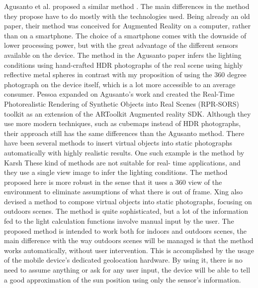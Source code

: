 
Agusanto et al. proposed a similar method \cite{agusanto2003}. The main differences in the method they propose have to do mostly with the technologies used. Being already an old paper, their method was conceived for Augmented Reality on a computer, rather than on a smartphone. The choice of a smartphone comes with the downside of lower processing power, but with the great advantage of the different sensors available on the device. The method in the Agusanto paper infers the lighting conditions using hand-crafted HDR photographs of the real scene using highly reflective metal spheres in contrast with my proposition of using the 360 degree photograph on the device itself, which is a lot more accessible to an average consumer.\newline
Pessoa\cite{pessoa2011} expanded on Agusanto's work and created the Real-Time Photorealistic Rendering of Synthetic Objects into Real Scenes (RPR-SORS) toolkit as an extension of the ARToolkit Augmented reality SDK. Although they use more modern techniques, such as cubemaps instead of HDR photographs, their approach still has the same differences than the Agusanto method.\newline
There have been several methods to insert virtual objects into static photographs automatically with highly realistic results. One such example is the method by Karsh \cite{karsh2014} These kind of methods are not suitable for real- time applications, and they use a single view image to infer the lighting conditions. The method proposed here is more robust in the sense that it uses a 360 view of the environment to eliminate assumptions of what there is out of frame.\newline
Xing\cite{xing2013} also devised a method to compose virtual objects into static photographs, focusing on outdoors scenes. The method is quite sophisticated, but a lot of the information fed to the light calculation functions involve manual input by the user. The proposed method is intended to work both for indoors and outdoors scenes, the main difference with the way outdoors scenes will be managed is that the method works automatically, without user intervention. This is accomplished by the usage of the mobile device's dedicated geolocation hardware. By using it, there is no need to assume anything or ask for any user input, the device will be able to tell a good approximation of the sun position using only the sensor's information.